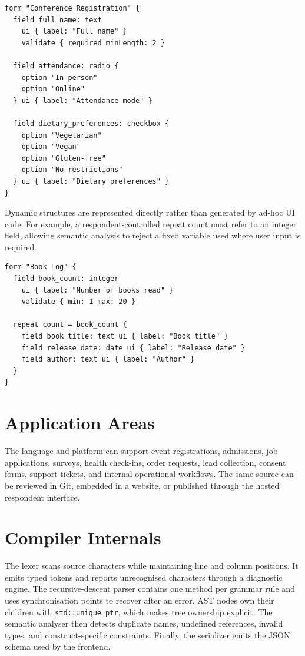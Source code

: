 \documentclass[12pt,a4paper,oneside]{report}
\begin{document}
\begin{lstlisting}[caption={Representative FormL form},label={lst:forml}]
form "Conference Registration" {
  field full_name: text
    ui { label: "Full name" }
    validate { required minLength: 2 }

  field attendance: radio {
    option "In person"
    option "Online"
  } ui { label: "Attendance mode" }

  field dietary_preferences: checkbox {
    option "Vegetarian"
    option "Vegan"
    option "Gluten-free"
    option "No restrictions"
  } ui { label: "Dietary preferences" }
}
\end{lstlisting}

Dynamic structures are represented directly rather than generated by ad-hoc UI code. For
example, a respondent-controlled repeat count must refer to an integer field, allowing semantic
analysis to reject a fixed variable used where user input is required.

\begin{lstlisting}[caption={Respondent-controlled repeat block},label={lst:repeat}]
form "Book Log" {
  field book_count: integer
    ui { label: "Number of books read" }
    validate { min: 1 max: 20 }

  repeat count = book_count {
    field book_title: text ui { label: "Book title" }
    field release_date: date ui { label: "Release date" }
    field author: text ui { label: "Author" }
  }
}
\end{lstlisting}

\section{Application Areas}
The language and platform can support event registrations, admissions, job applications,
surveys, health check-ins, order requests, lead collection, consent forms, support tickets, and
internal operational workflows. The same source can be reviewed in Git, embedded in a website,
or published through the hosted respondent interface.

\section{Compiler Internals}
The lexer scans source characters while maintaining line and column positions. It emits typed
tokens and reports unrecognised characters through a diagnostic engine. The recursive-descent
parser contains one method per grammar rule and uses synchronisation points to recover after an
error. AST nodes own their children with \texttt{std::unique\_ptr}, which makes tree ownership
explicit. The semantic analyser then detects duplicate names, undefined references, invalid
types, and construct-specific constraints. Finally, the serializer emits the JSON schema used
by the frontend.
\end{document}
